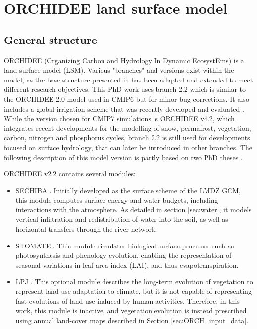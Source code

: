 \section{ORCHIDEE land surface model}
\label{sec:ORCHIDEE}
\subsection{General structure}
ORCHIDEE (Organizing Carbon and Hydrology In Dynamic EcosystEms) is a land surface model (LSM). Various "branches" and versions exist within the model, as the base structure presented in \citet{krinner_dynamic_2005} has been adapted and extended to meet different research objectives. 
This PhD work uses branch 2.2 which is similar to the ORCHIDEE 2.0 model used in CMIP6 \citep{cheruy_improved_2020, boucher_presentation_2020} but for minor bug corrections. It also includes a global irrigation scheme that was recently developed and evaluated \citep{arboleda-obando_validation_2024}. While the version chosen for CMIP7 simulations is ORCHIDEE v4.2, which integrates recent developments for the modelling of snow, permafrost, vegetation, carbon, nitrogen and phosphorus cycles, branch 2.2 is still used for developments focused on surface hydrology, that can later be introduced in other branches.
The following description of this model version is partly based on two PhD theses \citep{campoy_influence_2013,arboleda-obando_feedback_2023}.

\hfill

ORCHIDEE v2.2 contains several modules:
\begin{itemize}
    \item SECHIBA \citep[\textit{Schématisation des Échanges Hydriques à l’Interface entre la Biosphère et l’Atmo\-sphère}][]{ducoudre_sechiba_1993}. Initially developed as the surface scheme of the LMDZ GCM, this module computes surface energy and water budgets, including interactions with the atmosphere. As detailed in section \ref{sec:water}, it models vertical infiltration and redistribution of water into the soil, as well as horizontal transfers through the river network.
    \item STOMATE \citep{krinner_dynamic_2005}. This module simulates biological surface processes such as photosynthesis and phenology evolution, enabling the representation of seasonal variations in leaf area index (LAI), and thus evapotranspiration.
    \item LPJ \citep{sitch_evaluation_2003}. This optional module describes the long-term evolution of vegetation to represent land use adaptation to climate, but it is not capable of representing fast evolutions of land use induced by human activities. Therefore, in this work, this module is inactive, and vegetation evolution is instead prescribed using annual land-cover maps described in Section \ref{sec:ORCH_input_data}.
\end{itemize}

